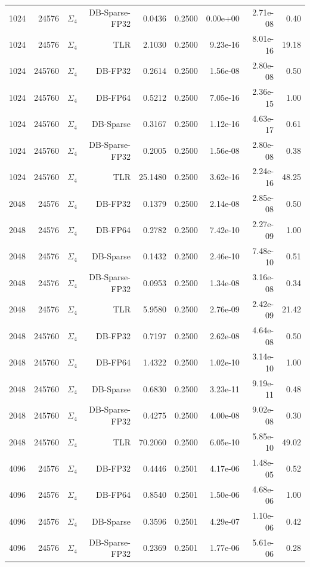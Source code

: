 \begin{tabular}{|r|r|r|r|r|r|r|r|r|}
  1024 & 24576 & $\Sigma_4$ & DB-Sparse-FP32 & 0.0436 & 0.2500 & 0.00e+00 & 2.71e-08 & 0.40 \\
  1024 & 24576 & $\Sigma_4$ & TLR & 2.1030 & 0.2500 & 9.23e-16 & 8.01e-16 & 19.18 \\
  1024 & 245760 & $\Sigma_4$ & DB-FP32 & 0.2614 & 0.2500 & 1.56e-08 & 2.80e-08 & 0.50 \\
  1024 & 245760 & $\Sigma_4$ & DB-FP64 & 0.5212 & 0.2500 & 7.05e-16 & 2.36e-15 & 1.00 \\
  1024 & 245760 & $\Sigma_4$ & DB-Sparse & 0.3167 & 0.2500 & 1.12e-16 & 4.63e-17 & 0.61 \\
  1024 & 245760 & $\Sigma_4$ & DB-Sparse-FP32 & 0.2005 & 0.2500 & 1.56e-08 & 2.80e-08 & 0.38 \\
  1024 & 245760 & $\Sigma_4$ & TLR & 25.1480 & 0.2500 & 3.62e-16 & 2.24e-16 & 48.25 \\
  2048 & 24576 & $\Sigma_4$ & DB-FP32 & 0.1379 & 0.2500 & 2.14e-08 & 2.85e-08 & 0.50 \\
  2048 & 24576 & $\Sigma_4$ & DB-FP64 & 0.2782 & 0.2500 & 7.42e-10 & 2.27e-09 & 1.00 \\
  2048 & 24576 & $\Sigma_4$ & DB-Sparse & 0.1432 & 0.2500 & 2.46e-10 & 7.48e-10 & 0.51 \\
  2048 & 24576 & $\Sigma_4$ & DB-Sparse-FP32 & 0.0953 & 0.2500 & 1.34e-08 & 3.16e-08 & 0.34 \\
  2048 & 24576 & $\Sigma_4$ & TLR & 5.9580 & 0.2500 & 2.76e-09 & 2.42e-09 & 21.42 \\
  2048 & 245760 & $\Sigma_4$ & DB-FP32 & 0.7197 & 0.2500 & 2.62e-08 & 4.64e-08 & 0.50 \\
  2048 & 245760 & $\Sigma_4$ & DB-FP64 & 1.4322 & 0.2500 & 1.02e-10 & 3.14e-10 & 1.00 \\
  2048 & 245760 & $\Sigma_4$ & DB-Sparse & 0.6830 & 0.2500 & 3.23e-11 & 9.19e-11 & 0.48 \\
  2048 & 245760 & $\Sigma_4$ & DB-Sparse-FP32 & 0.4275 & 0.2500 & 4.00e-08 & 9.02e-08 & 0.30 \\
  2048 & 245760 & $\Sigma_4$ & TLR & 70.2060 & 0.2500 & 6.05e-10 & 5.85e-10 & 49.02 \\
  4096 & 24576 & $\Sigma_4$ & DB-FP32 & 0.4446 & 0.2501 & 4.17e-06 & 1.48e-05 & 0.52 \\
  4096 & 24576 & $\Sigma_4$ & DB-FP64 & 0.8540 & 0.2501 & 1.50e-06 & 4.68e-06 & 1.00 \\
  4096 & 24576 & $\Sigma_4$ & DB-Sparse & 0.3596 & 0.2501 & 4.29e-07 & 1.10e-06 & 0.42 \\
  4096 & 24576 & $\Sigma_4$ & DB-Sparse-FP32 & 0.2369 & 0.2501 & 1.77e-06 & 5.61e-06 & 0.28 \\

\end{tabular}
